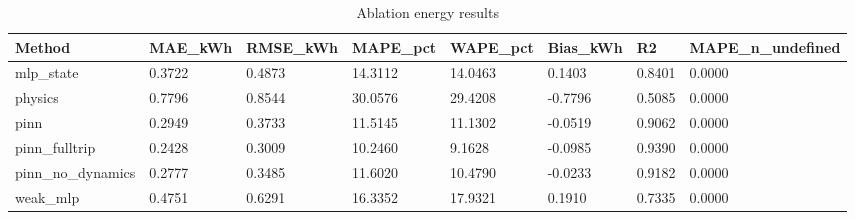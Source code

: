 \begin{table}[t]
\centering
\caption{Ablation energy results}
\label{tab:ablation}
\begin{tabular}{llllllll}
\hline
Method & MAE\_kWh & RMSE\_kWh & MAPE\_pct & WAPE\_pct & Bias\_kWh & R2 & MAPE\_n\_undefined \\
\hline
mlp\_state & 0.3722 & 0.4873 & 14.3112 & 14.0463 & 0.1403 & 0.8401 & 0.0000 \\
physics & 0.7796 & 0.8544 & 30.0576 & 29.4208 & -0.7796 & 0.5085 & 0.0000 \\
pinn & 0.2949 & 0.3733 & 11.5145 & 11.1302 & -0.0519 & 0.9062 & 0.0000 \\
pinn\_fulltrip & 0.2428 & 0.3009 & 10.2460 & 9.1628 & -0.0985 & 0.9390 & 0.0000 \\
pinn\_no\_dynamics & 0.2777 & 0.3485 & 11.6020 & 10.4790 & -0.0233 & 0.9182 & 0.0000 \\
weak\_mlp & 0.4751 & 0.6291 & 16.3352 & 17.9321 & 0.1910 & 0.7335 & 0.0000 \\
\hline
\end{tabular}
\end{table}
